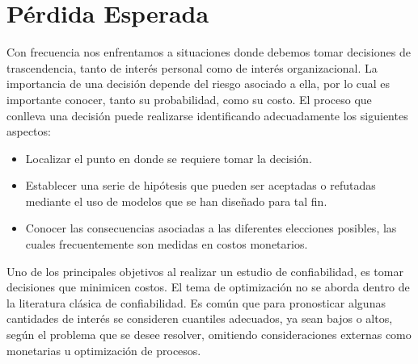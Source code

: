 
\chapter{P\'erdida Esperada}
\noindent Con frecuencia nos enfrentamos a situaciones donde debemos tomar decisiones de trascendencia, tanto de inter\'es personal como de inter\'es organizacional. La importancia  de una decisi\'on depende del riesgo asociado a ella, por lo cual es importante conocer,
tanto su probabilidad, como su costo. El proceso que conlleva una decisi\'on puede realizarse identificando adecuadamente los siguientes aspectos:

\begin{itemize}
\item Localizar el punto en donde se requiere tomar la decisi\'on.
\item Establecer una serie de hip\'otesis que pueden ser aceptadas o refutadas mediante el uso de modelos que se han dise\~nado para tal fin.
\item Conocer las consecuencias asociadas a las diferentes elecciones posibles, las cuales frecuentemente son medidas en costos monetarios.\end{itemize}


%
%
%

\noindent Uno de los principales objetivos al realizar un estudio de confiabilidad, es tomar decisiones que minimicen costos. El tema de optimizaci\'on no se aborda dentro de la literatura cl\'asica de confiabilidad. Es com\'un que para pronosticar algunas cantidades de inter\'es  se consideren cuantiles adecuados, ya sean bajos o altos, seg\'un el problema que se desee resolver, omitiendo consideraciones externas como monetarias u optimizaci\'on de procesos.

